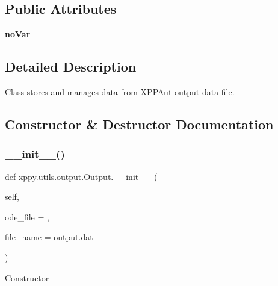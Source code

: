 \subsection*{Public Attributes}
\begin{DoxyCompactItemize}
\item 
\mbox{\label{classxppy_1_1utils_1_1output_1_1_output_a842bd0911dc035256fbc9fdb0185505c}} 
{\bfseries no\+Var}
\end{DoxyCompactItemize}


\subsection{Detailed Description}
\begin{DoxyVerb}Class stores and manages data from XPPAut output data file.
\end{DoxyVerb}
 

\subsection{Constructor \& Destructor Documentation}
\mbox{\label{classxppy_1_1utils_1_1output_1_1_output_a62d0df7e1f3a800edac050af678842c8}} 
\subsubsection{\texorpdfstring{\+\_\+\+\_\+init\+\_\+\+\_\+()}{\_\_init\_\_()}}
{\footnotesize\ttfamily def xppy.\+utils.\+output.\+Output.\+\_\+\+\_\+init\+\_\+\+\_\+ (\begin{DoxyParamCaption}\item[{}]{self,  }\item[{}]{ode\+\_\+file = {\ttfamily \textquotesingle{}\textquotesingle{}},  }\item[{}]{file\+\_\+name = {\ttfamily \textquotesingle{}output.dat\textquotesingle{}} }\end{DoxyParamCaption})}

\begin{DoxyVerb}Constructor
\end{DoxyVerb}
 

